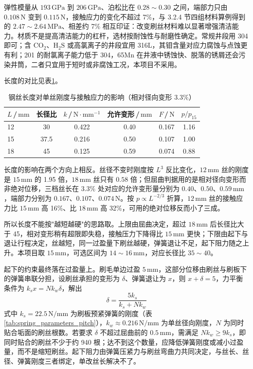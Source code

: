 弹性模量从 $193\,\mathrm{GPa}$ 到 $206\,\mathrm{GPa}$、泊松比在 $0.28\sim0.30$ 之间，端部力只由 $0.108\,\mathrm{N}$ 变到 $0.115\,\mathrm{N}$，接触应力的变化不超过 7\%，与 3.2.4 节四组材料算例得到的 $2.47\sim2.64\,\mathrm{MPa}$、相差约 7\% 相互印证：改变刷丝材料难以显著增强清洁能力。材质不是提高清洁能力的杠杆，选材按耐蚀性与耐磨性确定。常规井段用 304 即可；含 $\mathrm{CO_{2}}$、$\mathrm{H_{2}S}$ 或高氯离子的井段宜用 316L，其钼含量对应力腐蚀与点蚀更有利；201 的耐氯离子能力低于 304，65Mn 在井液中锈蚀快、脱落的锈屑还会污染井筒，二者只宜用于短时或非腐蚀工况，本项目不采用。

长度的对比见表\ref{tab:brush_length_compare}。

\begin{table}[H]
	\centering
	\caption{钢丝长度对单丝刚度与接触应力的影响（相对径向变形 $3.3\%$）}
	\label{tab:brush_length_compare}
	\renewcommand{\arraystretch}{1.3}
	\begin{tabular}{lccccc}
		\toprule
		$L$\,/\,$\mathrm{mm}$ & 长径比 & $k$\,/\,$\mathrm{N\cdot mm^{-1}}$ & 允许变形\,/\,$\mathrm{mm}$ & $F$\,/\,$\mathrm{N}$ & $p/p_{15}$ \\
		\midrule
		12 & 30 & 0.422 & 0.40 & 0.167 & 1.16 \\
		15 & 37.5 & 0.216 & 0.50 & 0.107 & 1.00 \\
		18 & 45 & 0.125 & 0.59 & 0.074 & 0.88 \\
		\bottomrule
	\end{tabular}
\end{table}

长度的影响在两个方向上相反。丝径不变时刚度按 $L^{3}$ 反比变化，$12\,\mathrm{mm}$ 丝的刚度是 $15\,\mathrm{mm}$ 的 1.95 倍，$18\,\mathrm{mm}$ 丝只有 $0.58$ 倍；但屈曲判据用的是相对径向变形而非绝对位移，三档丝长在 $3.3\%$ 处对应的允许变形量分别为 $0.40$、$0.50$、$0.59\,\mathrm{mm}$，端部力分别为 $0.167$、$0.107$、$0.074\,\mathrm{N}$。按 $p\propto L^{-2/3}$ 折算，$12\,\mathrm{mm}$ 丝的接触应力比 $15\,\mathrm{mm}$ 高 16\%、比 $18\,\mathrm{mm}$ 高 32\%，可用的绝对位移反而小了三成。

所以长度不能按"越短越硬"的思路取。上限由屈曲决定，超过 $18\,\mathrm{mm}$ 后长径比大于 45，相对变形稍有超限即失稳，接触压力下降得比 $15\,\mathrm{mm}$ 更快；下限由起下与退让行程决定，丝越短，同一过盈量下刷丝越硬，弹簧退让不足，起下阻力随之上升。本项目取 $15\,\mathrm{mm}$，可选区间为 $14\sim16\,\mathrm{mm}$，对应长径比 $35\sim40$。

起下的约束最终落在过盈量上。刷毛单边过盈 $5\,\mathrm{mm}$，这部分位移由刷丝与刷板下的弹簧串联分担，设刷丝承担的变形为 $\delta$、弹簧退让为 $x$，则 $x+\delta=5$，力平衡条件为 $k_{s}x=Nk_{w}\delta$，解出
\begin{equation}
\delta=\frac{5k_{s}}{k_{s}+Nk_{w}}
\label{eq:brush_clearance_split}
\end{equation}
式中 $k_{s}=22.5\,\mathrm{N/mm}$ 为刷板预紧弹簧的刚度（表\ref{tab:spring_parameters_pitch}），$k_{w}\approx0.216\,\mathrm{N/mm}$ 为单丝径向刚度，$N$ 为同时贴合垢面的刷丝根数。若要求 $\delta$ 不超过屈曲前的 $0.5\,\mathrm{mm}$，需满足 $Nk_{w}\ge9k_{s}$，即同时贴合的刷丝不少于约 940 根；达不到这个数量，应降低弹簧刚度或减小过盈量，而不是缩短刷丝。起下阻力由弹簧压紧力与刷丝弯曲力共同决定，与丝长、丝径、弹簧刚度三者绑定，单改丝长解决不了。


